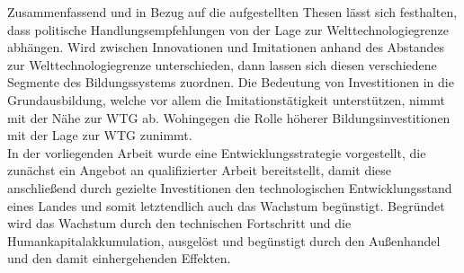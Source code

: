 Zusammenfassend und in Bezug auf die aufgestellten Thesen l{\"a}sst sich festhalten, dass politische Handlungsempfehlungen von der Lage zur Welttechnologiegrenze abh{\"a}ngen. Wird zwischen Innovationen und Imitationen anhand des Abstandes zur Welttechnologiegrenze unterschieden, dann lassen sich diesen verschiedene Segmente des Bildungssystems zuordnen. Die Bedeutung von Investitionen in die Grundausbildung, welche vor allem die Imitationst{\"a}tigkeit unterst{\"u}tzen, nimmt mit der N{\"a}he zur WTG ab. Wohingegen die Rolle h{\"o}herer Bildungsinvestitionen mit der Lage zur WTG zunimmt.\\
In der vorliegenden Arbeit wurde eine Entwicklungsstrategie vorgestellt, die zun{\"a}chst ein Angebot an qualifizierter Arbeit bereitstellt, damit diese anschlie{\ss}end durch gezielte Investitionen den technologischen Entwicklungsstand eines Landes und somit letztendlich auch das Wachstum beg{\"u}nstigt. Begr{\"u}ndet wird das Wachstum durch den technischen Fortschritt und die Humankapitalakkumulation, ausgel{\"o}st und beg{\"u}nstigt durch den Au{\ss}enhandel und den damit einhergehenden Effekten.
